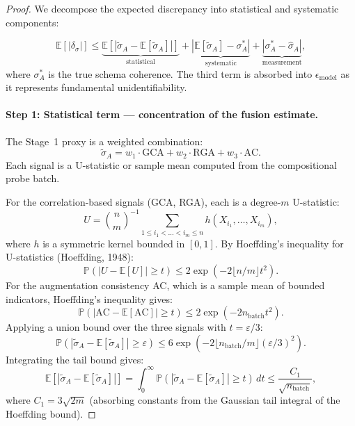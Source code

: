 \begin{proof}
We decompose the expected discrepancy into statistical and systematic
components:

\[
\mathbb{E}[|\delta_\sigma|] \leq
\underbrace{\mathbb{E}[|\tilde{\sigma}_A - \mathbb{E}[\tilde{\sigma}_A]|]}_{\text{statistical}}
+ \underbrace{|\mathbb{E}[\tilde{\sigma}_A] - \sigma_A^*|}_{\text{systematic}}
+ \underbrace{|\sigma_A^* - \hat{\sigma}_A|}_{\text{measurement}},
\]
where $\sigma_A^*$ is the true schema coherence. The third term is
absorbed into $\epsilon_{\text{model}}$ as it represents fundamental
unidentifiability.

\paragraph{Step 1: Statistical term — concentration of the fusion estimate.}
The Stage~1 proxy is a weighted combination:
\[
\tilde{\sigma}_A = w_1 \cdot \text{GCA} + w_2 \cdot \text{RGA} + w_3 \cdot \text{AC}.
\]
Each signal is a U-statistic or sample mean computed from the
compositional probe batch.

For the correlation-based signals (GCA, RGA), each is a
degree-$m$ U-statistic:
\[
U = \binom{n}{m}^{-1} \sum_{1 \leq i_1 < \dots < i_m \leq n}
h(X_{i_1}, \dots, X_{i_m}),
\]
where $h$ is a symmetric kernel bounded in $[0,1]$. By Hoeffding's
inequality for U-statistics (Hoeffding, 1948):
\[
\mathbb{P}(|U - \mathbb{E}[U]| \geq t) \leq 2 \exp(-2 \lfloor n/m \rfloor t^2).
\]
For the augmentation consistency AC, which is a sample mean of bounded
indicators, Hoeffding's inequality gives:
\[
\mathbb{P}(|\text{AC} - \mathbb{E}[\text{AC}]| \geq t) \leq 2 \exp(-2 n_{\text{batch}} t^2).
\]
Applying a union bound over the three signals with $t = \varepsilon/3$:
\[
\mathbb{P}(|\tilde{\sigma}_A - \mathbb{E}[\tilde{\sigma}_A]| \geq \varepsilon)
\leq 6 \exp\left(-2 \lfloor n_{\text{batch}} / m \rfloor (\varepsilon/3)^2\right).
\]
Integrating the tail bound gives:
\[
\mathbb{E}[|\tilde{\sigma}_A - \mathbb{E}[\tilde{\sigma}_A]|]
= \int_0^\infty \mathbb{P}(|\tilde{\sigma}_A - \mathbb{E}[\tilde{\sigma}_A]| \geq t) \, dt
\leq \frac{C_1}{\sqrt{n_{\text{batch}}}},
\]
where $C_1 = 3\sqrt{2m}$ (absorbing constants from the Gaussian tail
integral of the Hoeffding bound).


\end{proof}
